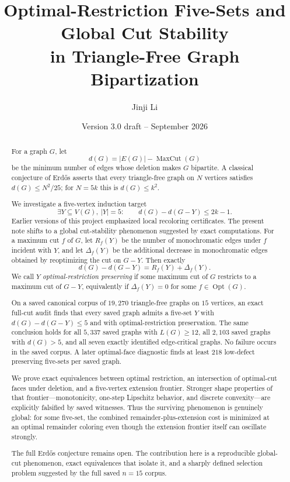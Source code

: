 \documentclass[11pt]{article}
\title{Optimal-Restriction Five-Sets and Global Cut Stability\\in Triangle-Free Graph Bipartization}
\author{Jinji Li}
\date{Version 3.0 draft -- September 2026}
\newcommand{\mc}{\operatorname{MaxCut}}
\newcommand{\dd}{d}
\newcommand{\Opt}{\operatorname{Opt}}
\begin{document}
\maketitle

\begin{abstract}
For a graph $G$, let
\[
\dd(G)=|E(G)|-\mc(G)
\]
be the minimum number of edges whose deletion makes $G$ bipartite.  A
classical conjecture of Erd\H{o}s asserts that every triangle-free graph on
$N$ vertices satisfies $\dd(G)\le N^2/25$; for $N=5k$ this is
$\dd(G)\le k^2$.

We investigate a five-vertex induction target
\[
\exists Y\subseteq V(G),\ |Y|=5:\qquad
\dd(G)-\dd(G-Y)\le 2k-1.
\]
Earlier versions of this project emphasized local recoloring certificates.
The present note shifts to a global cut-stability phenomenon suggested by
exact computations.  For a maximum cut $f$ of $G$, let
$R_f(Y)$ be the number of monochromatic edges under $f$ incident with $Y$,
and let $\Delta_f(Y)$ be the additional decrease in monochromatic edges
obtained by reoptimizing the cut on $G-Y$.  Then exactly
\[
\dd(G)-\dd(G-Y)=R_f(Y)+\Delta_f(Y).
\]
We call $Y$ \emph{optimal-restriction preserving} if some maximum cut of
$G$ restricts to a maximum cut of $G-Y$, equivalently if
$\Delta_f(Y)=0$ for some $f\in\Opt(G)$.

On a saved canonical corpus of $19{,}270$ triangle-free graphs on
$15$ vertices, an exact full-cut audit finds that every saved graph admits
a five-set $Y$ with $\dd(G)-\dd(G-Y)\le5$ and with optimal-restriction
preservation.  The same conclusion holds for all $5{,}337$ saved graphs
with $L(G)\ge12$, all $2{,}103$ saved graphs with $\dd(G)>5$, and all
seven exactly identified edge-critical graphs.  No failure occurs in the
saved corpus.  A later optimal-face diagnostic finds at least $218$
low-defect preserving five-sets per saved graph.

We prove exact equivalences between optimal restriction, an intersection
of optimal-cut faces under deletion, and a five-vertex extension frontier.
Stronger shape properties of that frontier---monotonicity, one-step
Lipschitz behavior, and discrete convexity---are explicitly falsified by
saved witnesses.  Thus the surviving phenomenon is genuinely global: for
some five-set, the combined remainder-plus-extension cost is minimized at
an optimal remainder coloring even though the extension frontier itself
can oscillate strongly.

The full Erd\H{o}s conjecture remains open.  The contribution here is a
reproducible global-cut phenomenon, exact equivalences that isolate it,
and a sharply defined selection problem suggested by the full saved
$n=15$ corpus.
\end{abstract}
\end{document}
